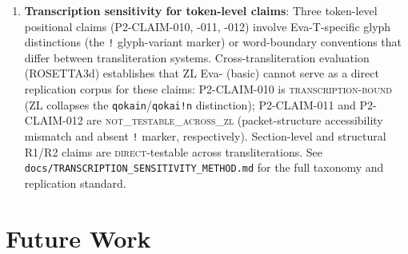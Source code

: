 \documentclass[11pt,a4paper,twocolumn]{article}
\begin{document}
\begin{enumerate}[leftmargin=*,itemsep=2pt]
    \item \textbf{Transcription sensitivity for token-level claims}: Three token-level positional claims (P2-CLAIM-010, -011, -012) involve Eva-T-specific glyph distinctions (the \texttt{!} glyph-variant marker) or word-boundary conventions that differ between transliteration systems. Cross-transliteration evaluation (ROSETTA3d) establishes that ZL Eva- (basic) cannot serve as a direct replication corpus for these claims: P2-CLAIM-010 is \textsc{transcription-bound} (ZL collapses the \texttt{qokain}/\texttt{qokai!n} distinction); P2-CLAIM-011 and P2-CLAIM-012 are \textsc{not\_testable\_across\_zl} (packet-structure accessibility mismatch and absent \texttt{!} marker, respectively). Section-level and structural R1/R2 claims are \textsc{direct}-testable across transliterations. See \texttt{docs/TRANSCRIPTION\_SENSITIVITY\_METHOD.md} for the full taxonomy and replication standard.

\end{enumerate}

\section{Future Work}
\label{sec:future}
\end{document}
